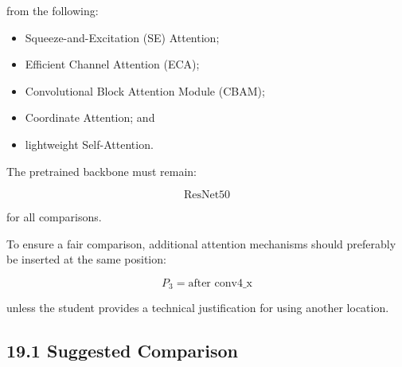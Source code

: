 \documentclass[10pt]{article}
\begin{document}
from the following:

\begin{itemize}

\item Squeeze-and-Excitation (SE) Attention;

\item Efficient Channel Attention (ECA);

\item Convolutional Block Attention Module (CBAM);

\item Coordinate Attention; and

\item lightweight Self-Attention.

\end{itemize}

The pretrained backbone must remain:

\[
\boxed{\text{ResNet50}}
\]

for all comparisons.

To ensure a fair comparison, additional attention mechanisms should
preferably be inserted at the same position:

\[
\boxed{
P_3=\text{after conv4\_x}
}
\]

unless the student provides a technical justification for using another
location.

\subsection*{19.1 Suggested Comparison}

\begin{center}
\end{center}
\end{document}
